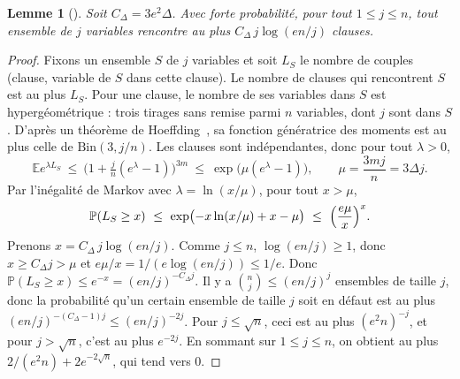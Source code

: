\documentclass[11pt,a4paper]{article}
\newtheorem{lemma}[theorem]{Lemme}
\theoremstyle{definition}
\theoremstyle{remark}
\newcommand{\E}{\mathbb{E}}
\newcommand{\PP}{\mathbb{P}}
\begin{document}
\begin{lemma}[{\cite[Lemme~A.2]{DL}}]\label{lem:A2}
Soit $C_\Delta=3e^2\Delta$. Avec forte probabilité, pour tout $1\le j\le n$, tout ensemble
de $j$ variables rencontre au plus $C_\Delta\,j\log(en/j)$ clauses.
\end{lemma}

\begin{proof}
Fixons un ensemble $S$ de $j$ variables et soit $L_S$ le nombre de couples (clause, variable
de $S$ dans cette clause). Le nombre de clauses qui rencontrent $S$ est au plus $L_S$. Pour
une clause, le nombre de ses variables dans $S$ est hypergéométrique : trois tirages sans
remise parmi $n$ variables, dont $j$ sont dans $S$. D'après un théorème de
Hoeffding~\cite[Théorème~4]{Hoe63}, sa fonction génératrice des moments est au plus celle de
$\mathrm{Bin}(3,j/n)$. Les clauses sont indépendantes, donc pour tout $\lambda>0$,
\[
\E e^{\lambda L_S}\ \le\ \bigl(1+\tfrac jn(e^\lambda-1)\bigr)^{3m}\ \le\ \exp\bigl(\mu(e^\lambda-1)\bigr),
\qquad \mu=\frac{3mj}{n}=3\Delta j .
\]
Par l'inégalité de Markov avec $\lambda=\ln(x/\mu)$, pour tout $x>\mu$,
\[
\PP(L_S\ge x)\ \le\ \exp\bigl(-x\ln(x/\mu)+x-\mu\bigr)\ \le\ \Bigl(\frac{e\mu}{x}\Bigr)^{x}.
\]
Prenons $x=C_\Delta\,j\log(en/j)$. Comme $j\le n$, $\log(en/j)\ge1$, donc
$x\ge C_\Delta j>\mu$ et $e\mu/x=1/(e\log(en/j))\le1/e$. Donc
$\PP(L_S\ge x)\le e^{-x}=(en/j)^{-C_\Delta j}$. Il y a $\binom nj\le(en/j)^j$ ensembles de
taille $j$, donc la probabilité qu'un certain ensemble de taille $j$ soit en défaut est au
plus $(en/j)^{-(C_\Delta-1)j}\le(en/j)^{-2j}$. Pour $j\le\sqrt n$, ceci est au plus
$(e^2n)^{-j}$, et pour $j>\sqrt n$, c'est au plus $e^{-2j}$. En sommant sur $1\le j\le n$,
on obtient au plus $2/(e^2n)+2e^{-2\sqrt n}$, qui tend vers $0$.
\end{proof}
\end{document}
